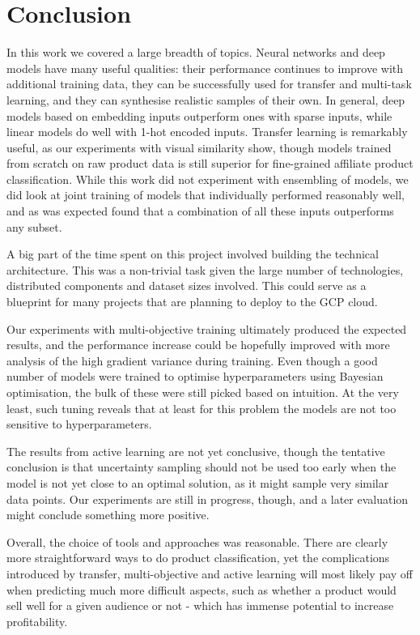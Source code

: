 \chapter{Conclusion}
\label{sum}

In this work we covered a large breadth of topics.
Neural networks and deep models have many useful qualities: their performance continues to improve with additional training data, they can be successfully used for transfer and multi-task learning, and they can synthesise realistic samples of their own.
In general, deep models based on embedding inputs outperform ones with sparse inputs, while linear models do well with 1-hot encoded inputs.
Transfer learning is remarkably useful, as our experiments with visual similarity show, though models trained from scratch on raw product data is still superior for fine-grained affiliate product classification.
While this work did not experiment with ensembling of models, we did look at joint training of models that individually performed reasonably well, and as was expected found that a combination of all these inputs outperforms any subset.

A big part of the time spent on this project involved building the technical architecture.
This was a non-trivial task given the large number of technologies, distributed components and dataset sizes involved.
This could serve as a blueprint for many projects that are planning to deploy to the GCP cloud.

Our experiments with multi-objective training ultimately produced the expected results, and the performance increase could be hopefully improved with more analysis of the high gradient variance during training.
Even though a good number of models were trained to optimise hyperparameters using Bayesian optimisation, the bulk of these were still picked based on intuition.
At the very least, such tuning reveals that at least for this problem the models are not too sensitive to hyperparameters.

The results from active learning are not yet conclusive, though the tentative conclusion is that uncertainty sampling should not be used too early when the model is not yet close to an optimal solution, as it might sample very similar data points.
Our experiments are still in progress, though, and a later evaluation might conclude something more positive.

Overall, the choice of tools and approaches was reasonable.
There are clearly more straightforward ways to do product classification, yet the complications introduced by transfer, multi-objective and active learning will most likely pay off when predicting much more difficult aspects, such as whether a product would sell well for a given audience or not - which has immense potential to increase profitability.
